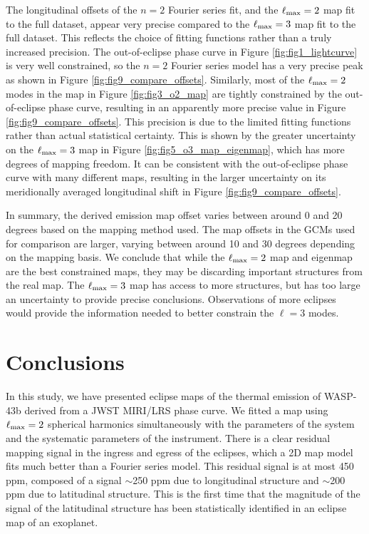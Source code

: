 \documentclass[twocolumn]{aastex631}
\begin{document}
The longitudinal offsets of the $n=2$ Fourier series fit, and the $\ell_{\rm max}=2$ map fit to the full dataset, appear very precise compared to the $\ell_{\rm max}=3$ map fit to the full dataset. This reflects the choice of fitting functions rather than a truly increased precision. The out-of-eclipse phase curve in Figure \ref{fig:fig1_lightcurve} is very well constrained, so the $n=2$ Fourier series model has a very precise peak as shown in Figure \ref{fig:fig9_compare_offsets}. Similarly, most of the $\ell_{\rm max}=2$ modes in the map in Figure \ref{fig:fig3_o2_map} are tightly constrained by the out-of-eclipse phase curve, resulting in an apparently more precise value in Figure \ref{fig:fig9_compare_offsets}. This precision is due to the limited fitting functions rather than actual statistical certainty. This is shown by the greater uncertainty on the $\ell_{\rm max}=3$ map in Figure \ref{fig:fig5_o3_map_eigenmap}, which has more degrees of mapping freedom. It can be consistent with the out-of-eclipse phase curve with many different maps, resulting in the larger uncertainty on its meridionally averaged longitudinal shift in Figure \ref{fig:fig9_compare_offsets}.

In summary, the derived emission map offset varies between around 0 and 20 degrees based on the mapping method used. The map offsets in the GCMs used for comparison are larger, varying between around 10 and 30 degrees depending on the mapping basis. We conclude that while the $\ell_{\rm max}=2$ map and eigenmap are the best constrained maps, they may be discarding important structures from the real map. The $\ell_{\rm max}=3$ map has access to more structures, but has too large an uncertainty to provide precise conclusions. Observations of more eclipses would provide the information needed to better constrain the $\ell=3$ modes.


\section{Conclusions}\label{sec:conclusions}

In this study, we have presented eclipse maps of the thermal emission of WASP-43b derived from a JWST MIRI/LRS phase curve. We fitted a map using $\ell_{\rm max}=2$ spherical harmonics simultaneously with the parameters of the system and the systematic parameters of the instrument. There is a clear residual mapping signal in the ingress and egress of the eclipses, which a 2D map model fits much better than a Fourier series model. This residual signal is at most 450 ppm, composed of a signal $\sim$250 ppm due to longitudinal structure and $\sim$200 ppm due to latitudinal structure. This is the first time that the magnitude of the signal of the latitudinal structure has been statistically identified in an eclipse map of an exoplanet.
\end{document}
